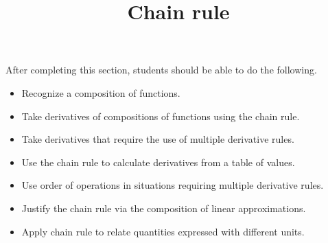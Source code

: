 \documentclass{ximera}
\title{Chain rule}
\begin{document}
\begin{abstract}
\end{abstract}

\maketitle

\begin{sectionOutcomes}

After completing this section, students should be able to do the following.

\begin{itemize}
	\item Recognize a composition of functions.
	\item Take derivatives of compositions of functions using the chain rule.
	\item Take derivatives that require the use of multiple derivative rules.
	\item Use the chain rule to calculate derivatives from a table of values.
	\item Use order of operations in situations requiring multiple derivative rules.
        \item Justify the chain rule via the composition of linear approximations.
        \item Apply chain rule to relate quantities expressed with different units.
\end{itemize}

\end{sectionOutcomes}
\end{document}
